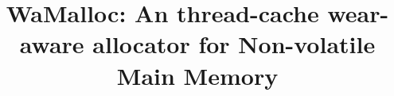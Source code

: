 \documentclass{vldb}
\begin{document}

\title{WaMalloc: An thread-cache wear-aware allocator for Non-volatile Main Memory}



%
%
%
%

\end{document}
